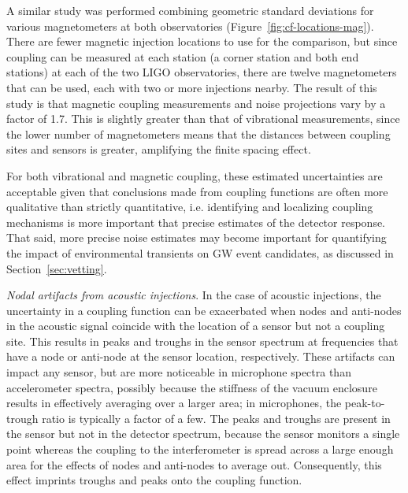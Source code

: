 A similar study was performed combining geometric standard deviations for various magnetometers at both observatories (Figure~\ref{fig:cf-locations-mag}).
There are fewer magnetic injection locations to use for the comparison, but since coupling can be measured at each station (a corner station and both end stations) at each of the two LIGO observatories, there are twelve magnetometers that can be used, each with two or more injections nearby.
The result of this study is that magnetic coupling measurements and noise projections vary by a factor of 1.7.
This is slightly greater than that of vibrational measurements, since the lower number of magnetometers means that the distances between coupling sites and sensors is greater, amplifying the finite spacing effect.

For both vibrational and magnetic coupling, these estimated uncertainties are acceptable given that conclusions made from coupling functions are often more qualitative than strictly quantitative, i.e. identifying and localizing coupling mechanisms is more important that precise estimates of the detector response.
That said, more precise noise estimates may become important for quantifying the impact of environmental transients on \ac{GW} event candidates, as discussed in Section~\ref{sec:vetting}.

\textit{Nodal artifacts from acoustic injections}.
In the case of acoustic injections, the uncertainty in a coupling function can be exacerbated when nodes and anti-nodes in the acoustic signal coincide with the location of a sensor but not a coupling site.
This results in peaks and troughs in the sensor spectrum at frequencies that have a node or anti-node at the sensor location, respectively.
These artifacts can impact any sensor, but are more noticeable in microphone spectra than accelerometer spectra, possibly because the stiffness of the vacuum enclosure results in effectively averaging over a larger area; in microphones, the peak-to-trough ratio is typically a factor of a few.
The peaks and troughs are present in the sensor but not in the detector spectrum, because the sensor monitors a single point whereas the coupling to the interferometer is spread across a large enough area for the effects of nodes and anti-nodes to average out.
Consequently, this effect imprints troughs and peaks onto the coupling function.

